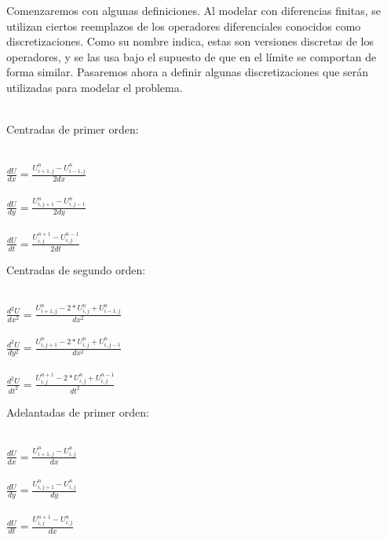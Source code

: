 Comenzaremos con algunas definiciones. Al modelar con diferencias finitas, se utilizan ciertos reemplazos de los operadores diferenciales conocidos como discretizaciones. Como su nombre indica, estas son versiones discretas de los operadores, y se las usa bajo el supuesto de que en el límite se comportan de forma similar. Pasaremos ahora a definir algunas discretizaciones que serán utilizadas para modelar el problema.
~\\
~\\
\begin{minipage}{\linewidth}

Centradas de primer orden:
\begin{center}

~\\
$\frac{dU}{dx} = \frac{U^{n}_{i+1,j} - U^{n}_{i-1,j}}{2dx} $
~\\
~\\
$\frac{dU}{dy} = \frac{U^{n}_{i,j+1} - U^{n}_{i,j-1}}{2dy} $
~\\
~\\
$\frac{dU}{dt} = \frac{U^{n+1}_{i,j} - U^{n-1}_{i,j}}{2dt} $
~\\
\end{center}

\end{minipage}
\begin{minipage}{\linewidth}



Centradas de segundo orden:
\begin{center}

~\\
$\frac{d^{2}U}{dx^{2}} = \frac{ U^{n}_{i+1,j} - 2*U^{n}_{i,j} + U^{n}_{i-1,j}}{dx^2}$
~\\
~\\
$\frac{d^{2}U}{dy^{2}} = \frac{ U^{n}_{i,j+1} - 2*U^{n}_{i,j} + U^{n}_{i,j-1}}{dx^2}$
~\\
~\\
$\frac{d^{2}U}{dt^{2}} = \frac{ U^{n+1}_{i,j} - 2*U^{n}_{i,j} + U^{n-1}_{i,j}}{dt^2}$
~\\
\end{center}

\end{minipage}
\begin{minipage}{\linewidth}

Adelantadas de primer orden:
\begin{center}

~\\
$\frac{dU}{dx} = \frac{U^{n}_{i+1,j} - U^{n}_{i,j}}{dx} $
~\\
~\\
$\frac{dU}{dy} = \frac{U^{n}_{i,j+1} - U^{n}_{i,j}}{dy} $
~\\
~\\
$\frac{dU}{dt} = \frac{U^{n+1}_{i,j} - U^{n}_{i,j}}{dx} $
~\\
\end{center}

\end{minipage}
